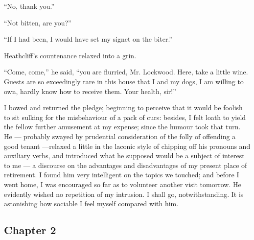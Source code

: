 \par “No, thank you.”
\par “Not bitten, are you?”
\par “If I had been, I would have set my signet on the biter.”
\par Heathcliff's countenance relaxed into a grin.
\par “Come, come,” he said, “you are flurried, Mr. Lockwood. Here, take a little wine. Guests are so exceedingly rare in this house that I and my dogs, I am willing to own, hardly know how to receive them. Your health, sir!”
\par I bowed and returned the pledge; beginning to perceive that it would be foolish to sit sulking for the misbehaviour of a pack of curs: besides, I felt loath to yield the fellow further amusement at my expense; since the humour took that turn. He — probably swayed by prudential consideration of the folly of offending a good tenant —relaxed a little in the laconic style of chipping off his pronouns and auxiliary verbs, and introduced what he supposed would be a subject of interest to me — a discourse on the advantages and disadvantages of my present place of retirement. I found him very intelligent on the topics we touched; and before I went home, I was encouraged so far as to volunteer another visit tomorrow. He evidently wished no repetition of my intrusion. I shall go, notwithstanding. It is astonishing how sociable I feel myself compared with him.


\subsection*{Chapter 2}


